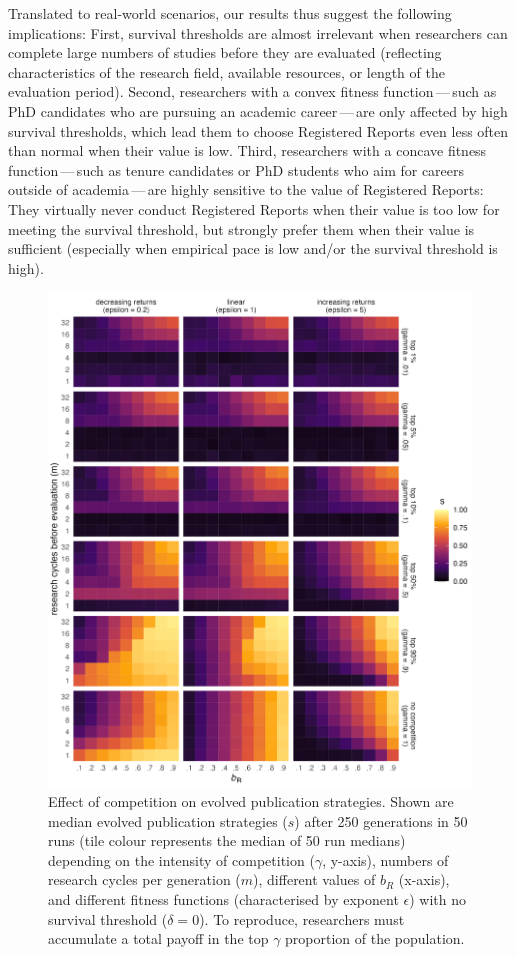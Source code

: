 \documentclass[
  ,man,mask,floatsintext]{apa6}
\begin{document}
Translated to real-world scenarios, our results thus suggest the following implications:
First, survival thresholds are almost irrelevant when
researchers can complete large numbers of studies before they are evaluated (reflecting characteristics of the research field, available resources, or length of the evaluation period).
Second, researchers with a convex fitness function\(\,\)---\(\,\)such as PhD candidates who are pursuing an academic career\(\,\)---\(\,\)are only affected by high survival thresholds, which lead them to choose Registered Reports even less often than normal when their value is low.
Third, researchers with a concave fitness function\(\,\)---\(\,\)such as tenure candidates or PhD students who aim for careers outside of academia\(\,\)---\(\,\)are highly sensitive to the value of Registered Reports:
They virtually never conduct Registered Reports when their value is too low for meeting the survival threshold, but strongly prefer them when their value is sufficient (especially when empirical pace is low and/or the survival threshold is high).



\begin{figure}
\includegraphics[width=1\linewidth]{plots/plot_gamma_tile_evo} \caption{Effect of competition on evolved publication strategies. Shown are median evolved publication strategies (\(s\)) after 250 generations in 50 runs (tile colour represents the median of 50 run medians) depending on the intensity of competition (\(\gamma\), y-axis), numbers of research cycles per generation (\(m\)), different values of \(b_{R}\) (x-axis), and different fitness functions (characterised by exponent \(\epsilon\)) with no survival threshold (\(\delta = 0\)). To reproduce, researchers must accumulate a total payoff in the top \(\gamma\) proportion of the population.}\label{fig:gammaplot}
\end{figure}
\end{document}
